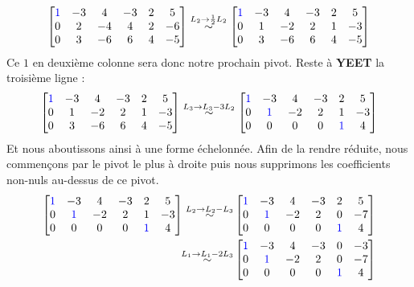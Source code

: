 $$
\begin{bmatrix}
 \color{blue}1 & -3 &  4 & -3 &  2 & 5\\
 0 & 2 &  -4 & 4 &  2 &  -6\\
 0 &  3 & -6 &  6 &  4 & -5
\end{bmatrix}
\overset{L_2 \to \frac{1}{2}L_2}{\sim}
\begin{bmatrix}
 \color{blue}1 & -3 &  4 & -3 &  2 & 5\\
 0 & 1 &  -2 & 2 &  1 &  -3\\
 0 &  3 & -6 &  6 &  4 & -5
\end{bmatrix}
$$
Ce $1$ en deuxième colonne sera donc notre prochain pivot. Reste à \textbf{YEET} la troisième ligne :
$$
\begin{bmatrix}
 \color{blue}1 & -3 &  4 & -3 &  2 & 5\\
 0 & 1 &  -2 & 2 &  1 &  -3\\
 0 &  3 & -6 &  6 &  4 & -5
\end{bmatrix}
\overset{L_3 \to L_3 - 3L_2}{\sim}
\begin{bmatrix}
 \color{blue}1 & -3 &  4 & -3 &  2 & 5\\
 0 & \color{blue}1 &  -2 & 2 &  1 &  -3\\
 0 &  0 & 0 &  0 &  \color{blue}1 & 4
\end{bmatrix}
$$
Et nous aboutissons ainsi à une forme échelonnée. Afin de la rendre réduite, nous commençons par le pivot le plus à droite puis nous supprimons les coefficients non-nuls au-dessus de ce pivot.
\begin{align*}
\begin{bmatrix}
 \color{blue}1 & -3 &  4 & -3 &  2 & 5\\
 0 & \color{blue}1 &  -2 & 2 &  1 &  -3\\
 0 &  0 & 0 &  0 &  \color{blue}1 & 4
\end{bmatrix}
\overset{L_2 \to L_2 - L_3}{\sim}
&\begin{bmatrix}
 \color{blue}1 & -3 &  4 & -3 &  2 & 5\\
 0 & \color{blue}1 &  -2 & 2 &  0 &  -7\\
 0 &  0 & 0 &  0 &  \color{blue}1 & 4
\end{bmatrix}\\
\overset{L_1 \to L_1 - 2L_3}{\sim}
&\begin{bmatrix}
 \color{blue}1 & -3 &  4 & -3 &  0 & -3\\
 0 & \color{blue}1 &  -2 & 2 &  0 &  -7\\
 0 &  0 & 0 &  0 &  \color{blue}1 & 4
\end{bmatrix}
\end{align*}
